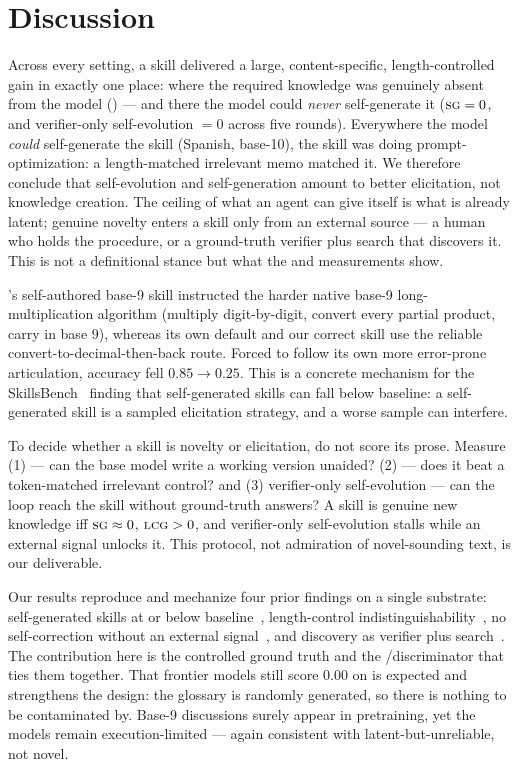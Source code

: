\section{Discussion}
\label{sec:discussion}

 Across every setting, a skill delivered a large,
content-specific, length-controlled gain in exactly one place: where the required knowledge was
genuinely absent from the model (\vocabzeth) --- and there the model could \emph{never}
self-generate it ($\textsc{sg}=0$, and verifier-only self-evolution $=0$ across five rounds). Everywhere
the model \emph{could} self-generate the skill (Spanish, base-10), the skill was doing
prompt-optimization: a length-matched irrelevant memo matched it. We therefore conclude that
self-evolution and self-generation amount to better elicitation, not knowledge creation. The
ceiling of what an agent can give itself is what is already latent; genuine novelty enters a
skill only from an external source --- a human who holds the procedure, or a ground-truth
verifier plus search that discovers it. This is not a definitional stance but what the \SG and
\LCG measurements show.

 \claude's self-authored base-9 skill instructed the
harder native base-9 long-multiplication algorithm (multiply digit-by-digit, convert every
partial product, carry in base 9), whereas its own default and our correct skill use the
reliable convert-to-decimal-then-back route. Forced to follow its own more error-prone
articulation, accuracy fell $0.85\to0.25$. This is a concrete mechanism for the
SkillsBench~\citep{skillsbench} finding that self-generated skills can fall below baseline: a
self-generated skill is a sampled elicitation strategy, and a worse sample can interfere.

 To decide whether a skill is novelty or elicitation,
do not score its prose. Measure (1) \SG --- can the base model write a working version unaided?
(2) \LCG --- does it beat a token-matched irrelevant control? and (3) verifier-only
self-evolution --- can the loop reach the skill without ground-truth answers? A skill is genuine
new knowledge iff $\textsc{sg}\approx0$, $\textsc{lcg}>0$, and verifier-only self-evolution stalls while an
external signal unlocks it. This protocol, not admiration of novel-sounding text, is our
deliverable.

 Our results reproduce and mechanize four prior findings on a
single substrate: self-generated skills at or below baseline~\citep{skillsbench},
length-control indistinguishability~\citep{dsskills}, no self-correction without an external
signal~\citep{cannotselfcorrect}, and discovery as verifier plus
search~\citep{alphaevolve}. The contribution here is the controlled ground truth and the
\SG/\LCG discriminator that ties them together. That frontier models still score $0.00$ on
\zeth is expected and strengthens the design: the glossary is randomly generated, so there is
nothing to be contaminated by. Base-9 discussions surely appear in pretraining, yet the models
remain execution-limited --- again consistent with latent-but-unreliable, not novel.

